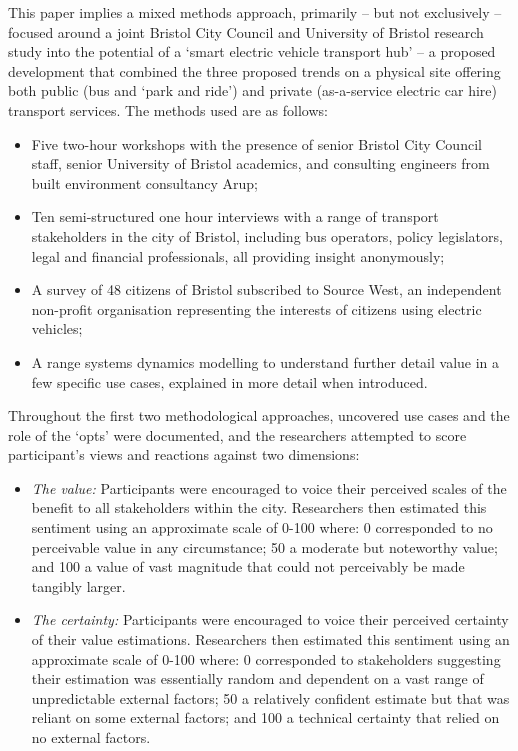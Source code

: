 \documentclass[b5paper,10pt]{article}
\begin{document}
This paper implies a mixed methods approach, primarily – but not
exclusively -- focused around a joint Bristol City Council and
University of Bristol research study into the potential of a `smart
electric vehicle transport hub' -- a proposed development that
combined the three proposed trends on a physical site offering both
public (bus and `park and ride') and private (as-a-service electric
car hire) transport services. The methods used are as follows:

\begin{itemize}
\item Five two-hour workshops with the presence of senior Bristol City
Council staff, senior University of Bristol academics, and consulting
engineers from built environment consultancy Arup;
\item Ten semi-structured one hour interviews with a range of
transport stakeholders in the city of Bristol, including bus
operators, policy legislators, legal and financial professionals, all
providing insight anonymously;
\item A survey of 48 citizens of Bristol subscribed to Source West, an
independent non-profit organisation representing the interests of
citizens using electric vehicles;
\item A range systems dynamics modelling to understand further detail
  value in a few specific use cases, explained in more detail when
  introduced.
\end{itemize}

Throughout the first two methodological approaches, uncovered use
cases and the role of the `opts' were documented, and the researchers
attempted to score participant's views and reactions against two
dimensions:

\begin{itemize}
\item {\emph{The value:}} Participants were encouraged to voice their
perceived scales of the benefit to all stakeholders within the
city. Researchers then estimated this sentiment using an approximate
scale of 0-100 where: 0 corresponded to no perceivable value in any
circumstance; 50 a moderate but noteworthy value; and 100 a value of
vast magnitude that could not perceivably be made tangibly larger.
\item {\emph{The certainty:}} Participants were encouraged to voice
their perceived certainty of their value estimations. Researchers then
estimated this sentiment using an approximate scale of 0-100 where: 0
corresponded to stakeholders suggesting their estimation was
essentially random and dependent on a vast range of unpredictable
external factors; 50 a relatively confident estimate but that was
reliant on some external factors; and 100 a technical certainty that
relied on no external factors.
\end{itemize}
\end{document}
